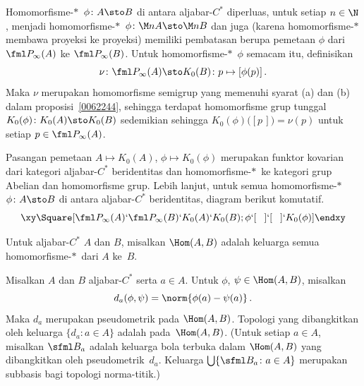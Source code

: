 \begin{defn} Homomorfisme-$*\,$ $\phi\colon A \sto B$ di antara aljabar-$C^*$ diperluas, untuk
setiap $n \in \N$, menjadi homomorfisme-$*\,$ $\phi\colon \M nA \sto \M nB$ dan juga (karena homomorfisme-$*\,$ membawa proyeksi
ke proyeksi) memiliki pembatasan berupa pemetaan $\phi$ dari $\fml P_\infty(A)$ ke $\fml P_\infty(B)$. %
Untuk homomorfisme-$*\,$ $\phi$ semacam itu, definisikan
   \[ \nu\colon \fml P_\infty(A) \sto K_0(B)\colon p \mapsto [\phi(p)]\,. \]
Maka $\nu$ merupakan homomorfisme semigrup yang memenuhi syarat (a) dan (b) dalam proposisi~\ref{0062244}, sehingga
terdapat homomorfisme grup tunggal
$K_0(\phi)\colon K_0(A) \sto K_0(B)$ sedemikian sehingga $K_0(\phi)\bigl([p\,]\bigr) = \nu(p)$ untuk setiap $p \in \fml P_\infty(A)$.
\end{defn}

\begin{prop} Pasangan pemetaan $A \mapsto K_0(A)$, $\phi \mapsto K_0(\phi)$ merupakan funktor kovarian
dari kategori aljabar-$C^*$ beridentitas dan homomorfisme-$*\,$ ke kategori grup Abelian dan
homomorfisme grup. Lebih lanjut, untuk semua homomorfisme-$*\,$ $\phi\colon A \sto B$ di antara aljabar-$C^*$ beridentitas, diagram
berikut komutatif.
  \[\xy
         \Square[\fml P_\infty(A)`\fml
         P_\infty(B)`K_0(A)`K_0(B);\phi`{[\hphantom{P}]}`{[\hphantom{P}]}`K_0(\phi)]
  \endxy\]
\end{prop}

\begin{notn} Untuk aljabar-$C^*$ $A$ dan $B$, misalkan
$\Hom(A,B)$ adalah keluarga semua homomorfisme-$*\,$ dari $A$ ke~$B$.
\end{notn}

\begin{defn} Misalkan $A$ dan $B$ aljabar-$C^*$ serta $a \in A$. Untuk $\phi$, $\psi \in \Hom(A,B)$,
misalkan
   \[ d_a(\phi,\psi) = \norm{\phi(a) - \psi(a)}\,. \]
Maka $d_a$ merupakan pseudometrik pada $\Hom (A,B)$. Topologi yang dibangkitkan oleh keluarga $\{d_a\colon a \in A\}$ adalah
 pada~$\Hom(A,B)$. (Untuk setiap $a \in A$, misalkan $\sfml B_a$ adalah keluarga bola terbuka dalam $\Hom(A,B)$ yang dibangkitkan oleh
pseudometrik~$d_a$. Keluarga $\bigcup\{\sfml B_a\colon a \in A\}$ merupakan subbasis bagi topologi norma-titik.)
\end{defn}

